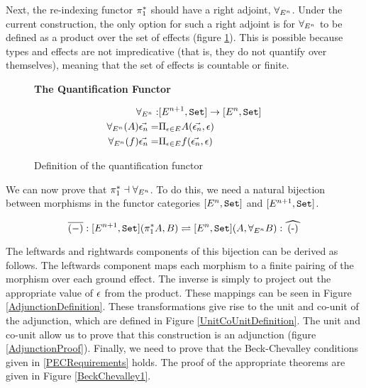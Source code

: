 \documentclass{Report}
\begin{document}
Next, the re-indexing functor $\pi_1^*$ should have a right adjoint, $\forall_{E^n}$. Under the current construction, the only option for such a right adjoint is for $\forall_{E^n}$ to be defined as a product over the set of effects (figure \ref{ProductQuantification}). This is possible because types and effects are not impredicative (that is, they do not quantify over themselves), meaning that the set of effects is countable or finite.

\begin{figure}
    \begin{framed}
        \centering
        \textbf{The Quantification Functor}

        \begin{align*}
            \forall_{E^n}:& [E^{n+1}, \texttt{Set}] \rightarrow [E^n, \texttt{Set}]\\
            \forall_{E^n}(A)\vec{\epsilon_n} =&\Pi_{\epsilon\in E}{A(\vec{\epsilon_n}, \epsilon)}
            \\ 
            \forall_{E^n}(f)\vec{\epsilon_n} =&\Pi_{\epsilon\in E}{f(\vec{\epsilon_n}, \epsilon)}
        \end{align*}
        
    \end{framed}
    \caption{Definition of the quantification functor}
    \label{ProductQuantification}
\end{figure}



We can now prove that $\pi_1^* \dashv \forall_{E^n}$. To do this, we need a natural bijection between morphisms in the functor categories $[E^n, \texttt{Set}]$ and $[E^{n+1}, \texttt{Set}]$.

\begin{equation}
    \bar{(-)}: [E^{n+1}, \set](\pstar A, B) \rightleftharpoons [E^n,\set] (A, \allEn B): \widehat{(-)}
\end{equation}

The leftwards and rightwards components of this bijection can be derived as follows. The leftwards component maps each morphism to a finite pairing of the morphism over each ground effect. The inverse is simply to project out the appropriate value of $\epsilon$ from the product. These mappings can be seen in Figure \ref{AdjunctionDefinition}. These transformations give rise to the unit and co-unit of the adjunction, which are defined in Figure \ref{UnitCoUnitDefinition}. The unit and co-unit allow us to prove that this construction is an adjunction (figure \ref{AdjunctionProof}).  Finally, we need to prove that the Beck-Chevalley conditions given in \ref{PECRequirements} holds. The proof of the appropriate theorems are given in Figure \ref{BeckChevalley1}.
\end{document}
